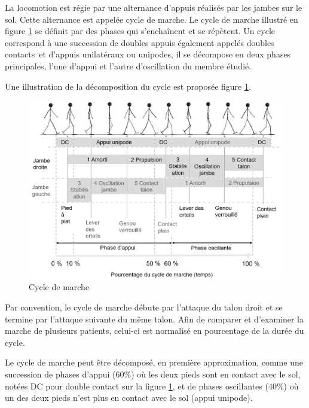 La locomotion est régie par une alternance d'appuis réalisés par les jambes sur le sol. Cette alternance est appelée cycle de marche. Le cycle de marche illustré en figure \ref{fig06} se définit par des phases qui s'enchaînent et se répètent. Un cycle correspond à une succession de doubles appuis également appelés \og doubles contacts\fg\ et d'appuis unilatéraux ou \og unipodes\fg , il se décompose en deux phases principales, l'une d'appui et l'autre d'oscillation du membre étudié.

Une illustration de la décomposition du cycle est proposée figure \ref{fig06}.

\begin{figure}[ht!]
\begin{center}
 \includegraphics[width=0.6\linewidth]{img/fig06}
\end{center}
\caption{\label{fig06} Cycle de marche}
\end{figure}

Par convention, le cycle de marche débute par l'attaque du talon droit et se termine par l'attaque suivante du même talon. Afin de comparer et d'examiner la marche de plusieurs patients, celui-ci est normalisé en pourcentage de la durée du cycle.


Le cycle de marche peut être décomposé, en première approximation, comme une succession de phases d'appui (60\%) où les deux pieds sont en contact avec le sol, notées DC pour double contact sur la figure \ref{fig06}, et de phases oscillantes (40\%) où un des deux pieds n'est plus en contact avec le sol (appui unipode).


